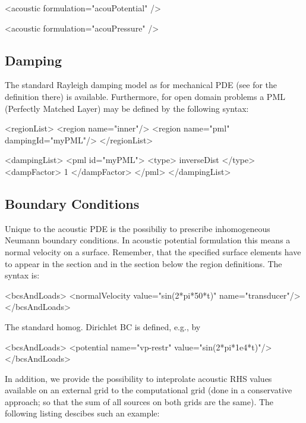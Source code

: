 \begin{xmllisting}
<acoustic formulation="acouPotential" />

<acoustic formulation="acouPressure" />
\end{xmllisting}

\subsection{Damping}
The standard Rayleigh damping model as for mechanical PDE (see for the
definition there) is available. Furthermore, for open domain problems
a PML (Perfectly Matched Layer) may be defined by the following
syntax:

\begin{xmllisting}
       <regionList>
          <region name="inner"/>
          <region name="pml" dampingId="myPML"/>
        </regionList>
        
        <dampingList>
          <pml  id="myPML">
            <type> inverseDist </type>
            <dampFactor> 1 </dampFactor>
          </pml>
        </dampingList>
\end{xmllisting}
  


\subsection{Boundary Conditions}
Unique to the acoustic PDE is the possibiliy to prescribe inhomogeneous Neumann
boundary conditions. In acoustic potential formulation this means a normal
velocity on a surface. Remember, that the specified surface elements have to
appear in the  section and in the  section
below the region definitions. The syntax is:

\begin{xmllisting} 
<bcsAndLoads>
    <normalVelocity value="sin(2*pi*50*t)" name="transducer"/> 
</bcsAndLoads>
\end{xmllisting}

The standard homog. Dirichlet BC is defined, e.g., by

\begin{xmllisting} 
<bcsAndLoads>
     <potential name="vp-restr" value="sin(2*pi*1e4*t)"/>
</bcsAndLoads>
\end{xmllisting}

In addition, we provide the possibility to inteprolate acoustic RHS
values available on an external grid to the computational grid (done
in a conservative approach; so that the sum of all sources on both
grids are the same). The following listing descibes such an example: 

